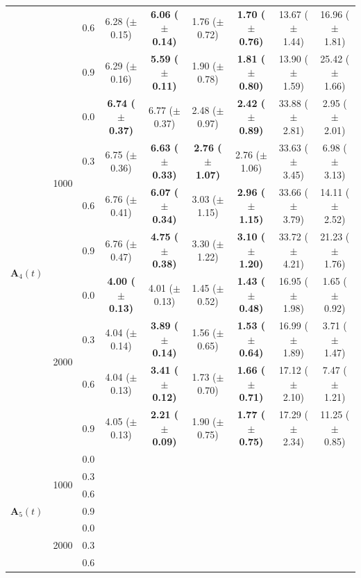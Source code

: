 \begin{table}[htbp]
{\begin{tabular}{lll|cc|cc|cc}
 &  & 0.6 & 6.28 ($\pm$ 0.15) & \textbf{6.06 ($\pm$ 0.14)} & 1.76 ($\pm$ 0.72) & \textbf{1.70 ($\pm$ 0.76)} & 13.67 ($\pm$ 1.44) & 16.96 ($\pm$ 1.81) \\
 &  & 0.9 & 6.29 ($\pm$ 0.16) & \textbf{5.59 ($\pm$ 0.11)} & 1.90 ($\pm$ 0.78) & \textbf{1.81 ($\pm$ 0.80)} & 13.90 ($\pm$ 1.59) & 25.42 ($\pm$ 1.66) \\
\hline
\multirow{8}{*}{$\mathbf{A}_4(t)$} & \multirow{4}{*}{1000} & 0.0 & \textbf{6.74 ($\pm$ 0.37)} & 6.77 ($\pm$ 0.37) & 2.48 ($\pm$ 0.97) & \textbf{2.42 ($\pm$ 0.89)} & 33.88 ($\pm$ 2.81) & 2.95 ($\pm$ 2.01) \\
 &  & 0.3 & 6.75 ($\pm$ 0.36) & \textbf{6.63 ($\pm$ 0.33)} & \textbf{2.76 ($\pm$ 1.07)} & 2.76 ($\pm$ 1.06) & 33.63 ($\pm$ 3.45) & 6.98 ($\pm$ 3.13) \\
 &  & 0.6 & 6.76 ($\pm$ 0.41) & \textbf{6.07 ($\pm$ 0.34)} & 3.03 ($\pm$ 1.15) & \textbf{2.96 ($\pm$ 1.15)} & 33.66 ($\pm$ 3.79) & 14.11 ($\pm$ 2.52) \\
 &  & 0.9 & 6.76 ($\pm$ 0.47) & \textbf{4.75 ($\pm$ 0.38)} & 3.30 ($\pm$ 1.22) & \textbf{3.10 ($\pm$ 1.20)} & 33.72 ($\pm$ 4.21) & 21.23 ($\pm$ 1.76) \\
\cline{2-9}
 & \multirow{4}{*}{2000} & 0.0 & \textbf{4.00 ($\pm$ 0.13)} & 4.01 ($\pm$ 0.13) & 1.45 ($\pm$ 0.52) & \textbf{1.43 ($\pm$ 0.48)} & 16.95 ($\pm$ 1.98) & 1.65 ($\pm$ 0.92) \\
 &  & 0.3 & 4.04 ($\pm$ 0.14) & \textbf{3.89 ($\pm$ 0.14)} & 1.56 ($\pm$ 0.65) & \textbf{1.53 ($\pm$ 0.64)} & 16.99 ($\pm$ 1.89) & 3.71 ($\pm$ 1.47) \\
 &  & 0.6 & 4.04 ($\pm$ 0.13) & \textbf{3.41 ($\pm$ 0.12)} & 1.73 ($\pm$ 0.70) & \textbf{1.66 ($\pm$ 0.71)} & 17.12 ($\pm$ 2.10) & 7.47 ($\pm$ 1.21) \\
 &  & 0.9 & 4.05 ($\pm$ 0.13) & \textbf{2.21 ($\pm$ 0.09)} & 1.90 ($\pm$ 0.75) & \textbf{1.77 ($\pm$ 0.75)} & 17.29 ($\pm$ 2.34) & 11.25 ($\pm$ 0.85) \\
\hline
\multirow{8}{*}{$\mathbf{A}_5(t)$} & \multirow{4}{*}{1000} & 0.0 &  &  &  &  &  &  \\
 &  & 0.3 &  &  &  &  &  &  \\
 &  & 0.6 &  &  &  &  &  &  \\
 &  & 0.9 &  &  &  &  &  &  \\
\cline{2-9}
 & \multirow{4}{*}{2000} & 0.0 &  &  &  &  &  &  \\
 &  & 0.3 &  &  &  &  &  &  \\
 &  & 0.6 &  &  &  &  &  &  \\

\end{tabular}}
\end{table}
